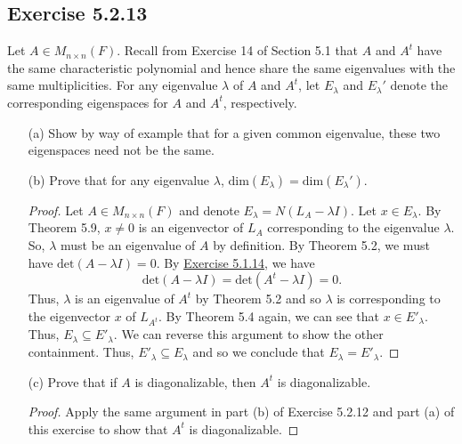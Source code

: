 \subsection*{Exercise 5.2.13} Let \( A \in {M}_{n \times n}(F)  \). Recall from Exercise 14 of Section 5.1 that \( A  \) and \( A^{t} \) have the same characteristic polynomial and hence share the same eigenvalues with the same multiplicities. For any eigenvalue \( \lambda  \) of \( A  \) and \( A^{t} \), let \( {E}_{\lambda} \) and \( {E}_{\lambda}' \) denote the corresponding eigenspaces for \( A  \) and \( A^{t} \), respectively.
\begin{enumerate}
    \item[(a)] Show by way of example that for a given common eigenvalue, these two eigenspaces need not be the same.
        \begin{solution}
        
        \end{solution}
    \item[(b)] Prove that for any eigenvalue \( \lambda  \), \( \text{dim}({E}_{\lambda}) = \text{dim}({E}_{\lambda}') \).
        \begin{proof}
        Let \( A \in {M}_{n \times n}(F) \) and denote \( {E}_{\lambda} = N({L}_{A} - \lambda I) \). Let \( x \in {E}_{\lambda}  \). By Theorem 5.9, \( x \neq 0  \) is an eigenvector of \( {L}_{A} \) corresponding to the eigenvalue \( \lambda  \). So, \( \lambda  \) must be an eigenvalue of \( A  \) by definition. By Theorem 5.2, we must have \( \text{det}(A - \lambda I ) = 0  \). By {\hyperref[Exercise 5.1.14]{Exercise 5.1.14}}, we have   
        \[ \text{det}(A - \lambda I ) = \text{det}(A^{t} - \lambda I ) = 0.  \]
        Thus, \( \lambda  \) is an eigenvalue of \( A^{t} \) by Theorem 5.2 and so \( \lambda  \) is corresponding to the eigenvector \( x  \) of \( L_{A^{t}} \). By Theorem 5.4 again, we can see that \( x \in {E}'_{\lambda} \). Thus, \( {E}_{\lambda} \subseteq {E}'_{\lambda} \). We can reverse this argument to show the other containment. Thus, \( {E}'_{\lambda} \subseteq {E}_{\lambda} \) and so we conclude that \( {E}_{\lambda} = E'_{\lambda} \).
        \end{proof}
    \item[(c)] Prove that if \( A  \) is diagonalizable, then \( A^{t}  \) is diagonalizable.
        \begin{proof}
        Apply the same argument in part (b) of Exercise 5.2.12 and part (a) of this exercise to show that \( A^{t} \) is diagonalizable.
        \end{proof}
\end{enumerate}

